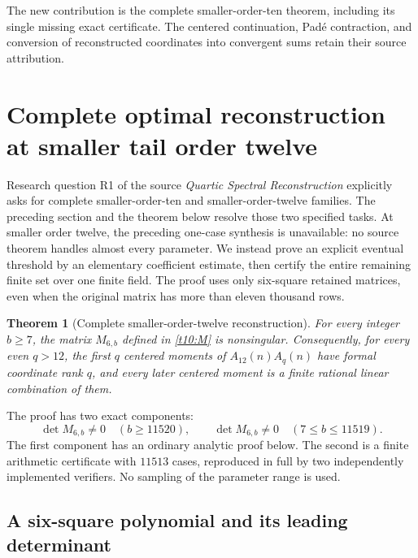 \documentclass[11pt,letterpaper]{article}
\numberwithin{equation}{section}
\newtheorem{theorem}{Theorem}[section]
\theoremstyle{definition}
\theoremstyle{remark}
\begin{document}
The new contribution is the complete smaller-order-ten theorem,
including its single missing exact certificate. The centered
continuation, Pad\'e contraction, and conversion of reconstructed
coordinates into convergent sums retain their source attribution.



\section{Complete optimal reconstruction at smaller tail order twelve}
\label{t12:section}

Research question R1 of the source \emph{Quartic Spectral Reconstruction}
explicitly asks for complete smaller-order-ten and smaller-order-twelve
families. The preceding section and the theorem below resolve those two
specified tasks. At smaller order twelve, the preceding one-case synthesis
is unavailable:
no source theorem handles almost every parameter. We instead prove an
explicit eventual threshold by an elementary coefficient estimate, then
certify the entire remaining finite set over one finite field. The proof
uses only six-square retained matrices, even when the original matrix has
more than eleven thousand rows.

\begin{theorem}[Complete smaller-order-twelve reconstruction]
\label{t12:complete}
For every integer $b\ge7$, the matrix $M_{6,b}$ defined in
\eqref{t10:M} is nonsingular. Consequently, for every even $q>12$,
the first $q$ centered moments of $A_{12}(n)A_q(n)$ have formal
coordinate rank $q$, and every later centered moment is a finite
rational linear combination of them.
\end{theorem}

The proof has two exact components:
\[
 \det M_{6,b}\ne0\quad(b\ge11520),\qquad
 \det M_{6,b}\ne0\quad(7\le b\le11519).
\]
The first component has an ordinary analytic proof below. The second is
a finite arithmetic certificate with $11513$ cases, reproduced in full
by two independently implemented verifiers. No sampling of the parameter
range is used.

\subsection{A six-square polynomial and its leading determinant}
\end{document}
